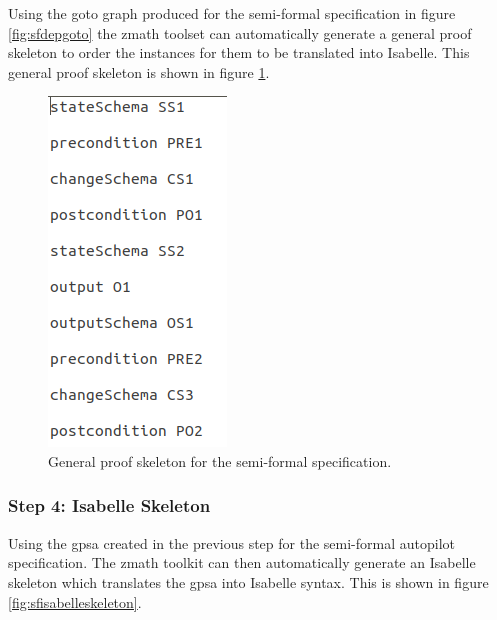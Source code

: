 Using the goto graph produced for the semi-formal specification in figure
 \ref{fig:sfdepgoto} the \gls{zmath} toolset can automatically generate a
 general proof skeleton to order the instances for them to be translated into
 Isabelle. This general proof skeleton is shown in figure \ref{fig:sfgpsa}.

 \begin{figure}[H]
 \centering
 \includegraphics[scale=0.5]{Figures/fullexample/sfgpsa.png}
 \caption{General proof skeleton for the semi-formal specification. \label{fig:sfgpsa}}
 \end{figure}

 \subsubsection{Step 4: Isabelle Skeleton}

 Using the \gls{gpsa} created in the previous step for the semi-formal autopilot
 specification. The \gls{zmath} toolkit can then automatically generate an
 Isabelle skeleton which translates the \gls{gpsa} into Isabelle syntax. This is
 shown in figure \ref{fig:sfisabelleskeleton}.

